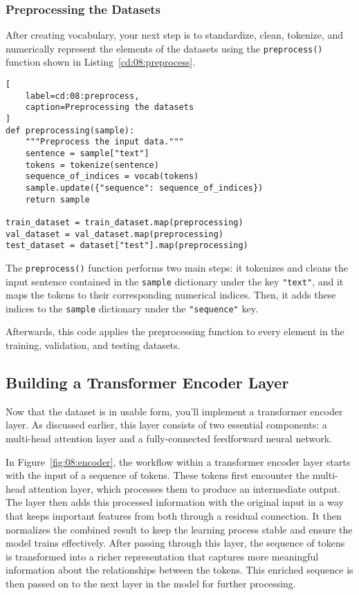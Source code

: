 \subsubsection{Preprocessing the Datasets}

After creating  vocabulary, your next step is to standardize, clean, tokenize, and numerically represent the elements of the datasets using the \lstinline{preprocess()} function shown in Listing~\ref{cd:08:preprocess}.
\begin{lstlisting}[
    label=cd:08:preprocess,
    caption=Preprocessing the datasets
]
def preprocessing(sample):
    """Preprocess the input data."""
    sentence = sample["text"]
    tokens = tokenize(sentence)
    sequence_of_indices = vocab(tokens)
    sample.update({"sequence": sequence_of_indices}) 
    return sample

train_dataset = train_dataset.map(preprocessing)
val_dataset = val_dataset.map(preprocessing)
test_dataset = dataset["test"].map(preprocessing)
\end{lstlisting}
The \lstinline{preprocess()} function performs two main steps: it tokenizes and cleans the input sentence contained in the \lstinline{sample} dictionary under the key \lstinline{"text"}, and it maps the tokens to their corresponding numerical indices. Then, it adds these indices to the \lstinline{sample} dictionary under the \lstinline{"sequence"} key.

Afterwards, this code applies the preprocessing function to every element in the training, validation, and testing datasets.

\subsection{Building a Transformer Encoder Layer}

Now that the dataset is in usable form, you'll implement a transformer encoder layer. As discussed earlier, this layer consists of two essential components: a multi-head attention layer and a fully-connected feedforward neural network.

In Figure~\ref{fig:08:encoder}, the workflow within a transformer encoder layer starts with the input of a sequence of tokens. These tokens first encounter the multi-head attention layer, which processes them to produce an intermediate output. The layer then adds this processed information with the original input in a way that keeps important features from both through a residual connection. It then normalizes the combined result to keep the learning process stable and ensure the model trains effectively.
After passing through this layer, the sequence of tokens is transformed into a richer representation that captures more meaningful information about the relationships between the tokens. This enriched sequence is then passed on to the next layer in the model for further processing.

